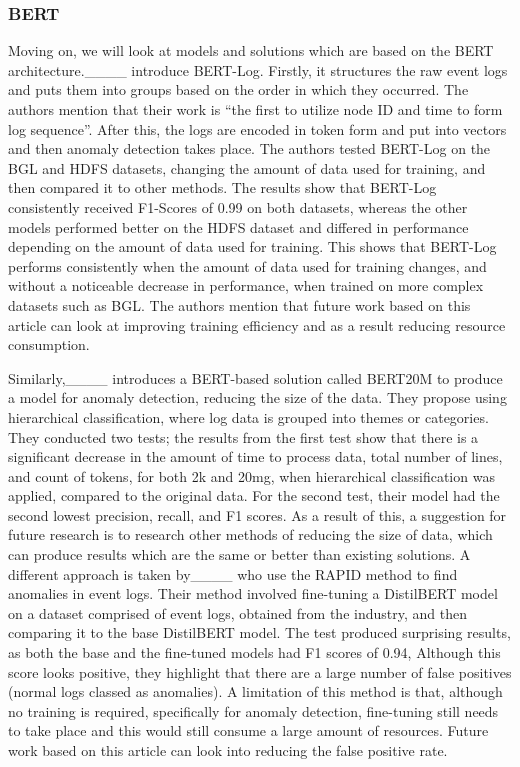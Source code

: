 \subsubsection{BERT}
Moving on, we will look at models and solutions which are based on the BERT architecture.____ introduce BERT-Log. Firstly, it structures the raw event logs and puts them into groups based on the order in which they occurred. The authors mention that their work is ``the first to utilize node ID and time to form log sequence''. After this, the logs are encoded in token form and put into vectors and then anomaly detection takes place. The authors tested BERT-Log on the BGL and HDFS datasets, changing the amount of data used for training, and then compared it to other methods. The results show that BERT-Log consistently received F1-Scores of 0.99 on both datasets, whereas the other models performed better on the HDFS dataset and differed in performance depending on the amount of data used for training. This shows that BERT-Log performs consistently when the amount of data used for training changes, and without a noticeable decrease in performance, when trained on more complex datasets such as BGL. The authors mention that future work based on this article can look at improving training efficiency and as a result reducing resource consumption. 

Similarly,____ introduces a BERT-based solution called BERT20M to produce a model for anomaly detection, reducing the size of the data. They propose using hierarchical classification, where log data is grouped into themes or categories. They conducted two tests; the results from the first test show that there is a significant decrease in the amount of time to process data, total number of lines, and count of tokens, for both 2k and 20mg, when hierarchical classification was applied, compared to the original data. For the second test, their model had the second lowest precision, recall, and F1 scores. As a result of this, a suggestion for future research is to research other methods of reducing the size of data, which can produce results which are the same or better than existing solutions. A different approach is taken by____ who use the RAPID method to find anomalies in event logs. Their method involved fine-tuning a DistilBERT model on a dataset comprised of event logs, obtained from the industry, and then comparing it to the base DistilBERT model. The test produced surprising results, as both the base and the fine-tuned models had F1 scores of 0.94, Although this score looks positive, they highlight that there are a large number of false positives (normal logs classed as anomalies). A limitation of this method is that, although no training is required, specifically for anomaly detection, fine-tuning still needs to take place and this would still consume a large amount of resources. Future work based on this article can look into reducing the false positive rate. 

